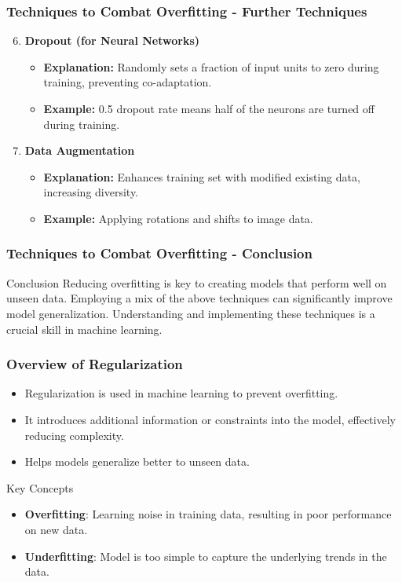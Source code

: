 \documentclass[aspectratio=169]{beamer}
\begin{document}
\begin{frame}[fragile]
    \frametitle{Techniques to Combat Overfitting - Further Techniques}
    \begin{enumerate}
        \setcounter{enumi}{5}
        \item \textbf{Dropout (for Neural Networks)}
            \begin{itemize}
                \item \textbf{Explanation:} Randomly sets a fraction of input units to zero during training, preventing co-adaptation.
                \item \textbf{Example:} 0.5 dropout rate means half of the neurons are turned off during training.
            \end{itemize}

        \item \textbf{Data Augmentation}
            \begin{itemize}
                \item \textbf{Explanation:} Enhances training set with modified existing data, increasing diversity.
                \item \textbf{Example:} Applying rotations and shifts to image data.
            \end{itemize}
    \end{enumerate}
\end{frame}

\begin{frame}[fragile]
    \frametitle{Techniques to Combat Overfitting - Conclusion}
    \begin{block}{Conclusion}
        Reducing overfitting is key to creating models that perform well on unseen data. Employing a mix of the above techniques can significantly improve model generalization. Understanding and implementing these techniques is a crucial skill in machine learning.
    \end{block}
\end{frame}

\begin{frame}[fragile]
    \frametitle{Overview of Regularization}
    \begin{itemize}
        \item Regularization is used in machine learning to prevent overfitting.
        \item It introduces additional information or constraints into the model, effectively reducing complexity.
        \item Helps models generalize better to unseen data.
    \end{itemize}

    \begin{block}{Key Concepts}
        \begin{itemize}
            \item \textbf{Overfitting}: Learning noise in training data, resulting in poor performance on new data.
            \item \textbf{Underfitting}: Model is too simple to capture the underlying trends in the data.
        \end{itemize}
    \end{block}
\end{frame}
\end{document}
